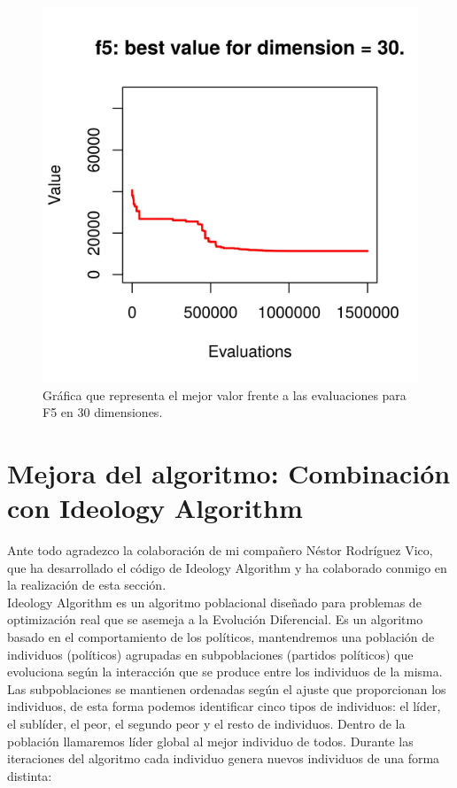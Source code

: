 \documentclass[11pt,a4paper]{article}
\begin{document}
\begin{figure}[!h]
\begin{minipage}[b]{0.4\textwidth}
			\includegraphics[width=\textwidth]{Imagenes/VS_f5_d30.jpg}
			\caption{Gráfica que representa el mejor valor frente a las evaluaciones para F5 en 30 dimensiones.}
		\end{minipage}
	\end{figure}
	
	\clearpage
	
\section{Mejora del algoritmo: Combinación con Ideology Algorithm}

	\noindent Ante todo agradezco la colaboración de mi compañero Néstor Rodríguez Vico, que ha desarrollado el código de Ideology Algorithm y ha colaborado conmigo en la realización de esta sección.\\

	\noindent Ideology Algorithm es un algoritmo poblacional diseñado para problemas de optimización real que se asemeja a la Evolución Diferencial. Es un algoritmo basado en el comportamiento de los políticos, mantendremos una población de individuos (políticos) agrupadas en subpoblaciones (partidos políticos) que evoluciona según la interacción que se produce entre los individuos de la misma. Las subpoblaciones se mantienen ordenadas según el ajuste que proporcionan los individuos, de esta forma podemos identificar cinco tipos de individuos: el líder, el sublíder, el peor, el segundo peor y el resto de individuos. Dentro de la población llamaremos líder global al mejor individuo de todos. Durante las iteraciones del algoritmo cada individuo genera nuevos individuos de una forma distinta:
	
\end{document}
